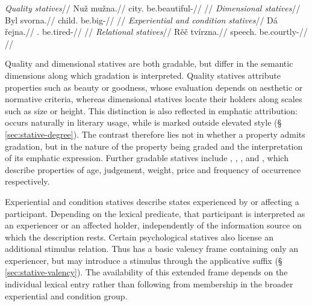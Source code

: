 \pex[belowglpreambleskip=0.25ex]\label{ex:stative-semantic-classes}
\a
\begingl
\glpreamble \textit{Quality statives}//
\gla Nuž mužna.//
\glb city.\Dir{} be.beautiful-\Cont{}//
\glft {}//
\endgl
\a
\begingl
\glpreamble \textit{Dimensional statives}//
\gla Byl svorna.//
\glb child.\Dir{} be.big-\Cont{}//
\glft {}//
\endgl
\a
\begingl
\glpreamble \textit{Experiential and condition statives}//
\gla Dá řejna.//
\Sg{}.\Dir{} be.tired-\Cont{}//
\glft {}//
\endgl
\a
\begingl
\glpreamble \textit{Relational statives}//
\gla Rěč tvírzna.//
\glb speech.\Dir{} be.courtly-\Cont{}//
\glft {}//
\endgl
\xe

Quality and dimensional statives are both gradable, but differ in the semantic
dimensions along which gradation is interpreted. Quality statives attribute
properties such as beauty or goodness, whose evaluation depends on aesthetic
or normative criteria, whereas dimensional statives locate their holders along
scales such as size or height. This distinction is also reflected in emphatic
attribution:   occurs naturally in
literary usage, while   is marked outside
elevated style (§\,\ref{sec:stative-degree}). The contrast therefore lies not
in whether a property admits gradation, but in the nature of the property
being graded and the interpretation of its emphatic expression. Further
gradable statives include  ,
 ,  ,
  and  ,
which describe properties of age, judgement, weight, price and frequency of
occurrence respectively.

Experiential and condition statives describe states experienced by or
affecting a participant. Depending on the lexical predicate, that participant
is interpreted as an experiencer or an affected holder, independently of the
information source on which the description rests. Certain psychological
statives also license an additional stimulus relation. Thus
  has a basic valency frame containing only an
experiencer, but may introduce a stimulus through the applicative suffix
 (§\,\ref{sec:stative-valency}). The availability of this
extended frame depends on the individual lexical entry rather than following
from membership in the broader experiential and condition group.

